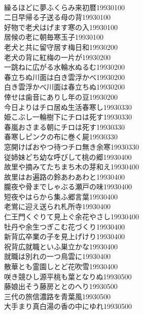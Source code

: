 \begin{multicols}{2}
\\繰るほどに夢ふくらみ来初暦\hfill{19930100}
\\二日早帰る子送る母の背\hfill{19930100}
\\好物で老犬はげます寒の入\hfill{19930100}
\\居候の老に朝毎寒玉子\hfill{19930100}
\\老犬と共に留守居す梅日和\hfill{19930200}
\\老犬の背に紅梅の一片が\hfill{19930200}
\\一跳ねに広がる水輪水ぬるむ\hfill{19930200}
\\春立ちぬ川面は白き雲浮かべ\hfill{19930200}
\\白き雲浮かべ川面は春立ちぬ\hfill{19930200}
\\倖せは歯音にありし年の豆\hfill{19930200}
\\今日よりはチロ居ぬ生活春寒し\hfill{19930330}
\\姫こぶし一輪樹下にチロは死す\hfill{19930330}
\\春嵐おさまる朝にチロは死す\hfill{19930330}
\\春寒しピンクの布に巻く屍\hfill{19930330}
\\窓開けばおやつ待つチロ無き余寒\hfill{19930330}
\\従姉妹どち幼な呼びして桃の郷\hfill{19930400}
\\故里や摘みてたちまち木の芽和え\hfill{19930400}
\\故里はお遍路の鈴あわあわと\hfill{19930400}
\\朧夜や骨までしゃぶる瀬戸の味\hfill{19930400}
\\短夜やはらから集ふ郷言葉\hfill{19930400}
\\老鴬に迎え送られ札所寺\hfill{19930400}
\\仁王門くぐりて見上ぐ余花やさし\hfill{19930400}
\\牡丹や余生つぎこむ花づくり\hfill{19930400}
\\新背広卒業の子を見上げけり\hfill{19930400}
\\祝背広就職といふ巣立かな\hfill{19930400}
\\就職は別れの一つ鳥雲に\hfill{19930400}
\\散華とも霊園しとど花吹雪\hfill{19930400}
\\咲き競ひし源平桃も葉となりぬ\hfill{19930500}
\\藤娘出そう藤房ととのへり\hfill{19930500}
\\三代の旅信濃路を青葉風\hfill{19930500}
\\大手まり真白湯の香の中にゆれ\hfill{19930500}

\end{multicols}
